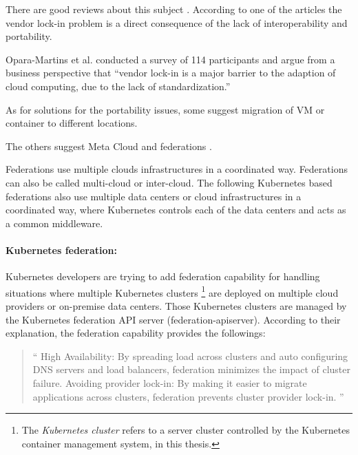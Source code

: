 There are good reviews about this subject \cite{kaur2017interoperability,petcu2014portability}.
According to one of the articles the vendor lock-in problem is a direct consequence of the lack of interoperability and portability.


Opara-Martins et al. \cite{opara2016critical} conducted a survey of 114 participants and argue from a business perspective that \enquote{vendor lock-in is a major barrier to the adaption of cloud computing, due to the lack of standardization.}

%

As for solutions for the portability issues,
some suggest migration of VM or container \cite{nagin2011inter,messina2014trust} to different locations.

The others suggest Meta Cloud \cite{satzger2013winds} and federations \cite{K8sFederation2017}.


Federations use multiple clouds infrastructures in a coordinated way.
Federations can also be called multi-cloud or inter-cloud.
The following Kubernetes based federations also use multiple data centers or cloud infrastructures in a coordinated way, where Kubernetes controls each of the data centers and acts as a common middleware.


\paragraph{\bf Kubernetes federation:}

Kubernetes developers are trying to add federation \cite{K8sFederation2017} capability for handling situations 
where multiple Kubernetes clusters \footnote{The {\em Kubernetes cluster} refers to a server cluster 
controlled by the Kubernetes container management system, in this thesis.} 
are deployed on multiple cloud providers or on-premise data centers. 
Those Kubernetes clusters are managed by the Kubernetes federation API server (federation-apiserver).
According to their explanation\cite{K8sFederation2017}, the federation capability provides the followings: 
\begin{quote}
\enquote{
High Availability: By spreading load across clusters and auto configuring DNS servers and load balancers, federation minimizes the impact of cluster failure.
Avoiding provider lock-in: By making it easier to migrate applications across clusters, federation prevents cluster provider lock-in.
}
\end{quote}



